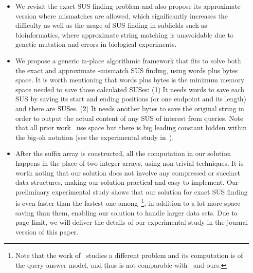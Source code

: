 \documentclass[11pt]{llncs}
\begin{document}
\begin{itemize}
\item 
We revisit the exact SUS finding problem and also
propose its approximate version where mismatches are allowed, which
significantly increases the difficulty as well as
the usage of SUS finding in subfields such as
bioinformatics, where approximate string matching is unavoidable due
to genetic mutation and errors in biological experiments.

\item 
We propose a generic in-place algorithmic framework that fits to solve
both the exact and approximate -mismatch SUS finding, using 
words plus  bytes space. It is worth mentioning that  words
plus  bytes is the minimum memory space needed to save those 
calculated SUSes: (1) It needs  words to save each SUS by saving
its start and ending positions (or one endpoint and its length) and
there are  SUSes. (2) It needs another  bytes to save the
original string  in order to output the actual content of any SUS
of interest from queries. Note that all prior
work~\cite{PWY-ICDE2013,TIBT2014,IKX-tcs2015,HPT-spire2014} use 
space but there is big leading constant hidden within the big-oh
notation (see the experimental study in~\cite{IKX-tcs2015}).

\item After the suffix array is constructed, all the computation in
  our solution happens in the place of two integer arrays, 
 using non-trivial techniques. It is worth noting that our solution
 does not 
  involve any compressed or succinct data structures, making our solution
  practical and easy to implement.  Our preliminary experimental study
  shows that our solution for exact SUS finding is even faster than
  the fastest one
  among~\cite{PWY-ICDE2013,TIBT2014,IKX-tcs2015}\footnote{Note
    that the work of~\cite{HPT-spire2014} studies a different problem and its
    computation is of the query-answer model, and thus is not
    comparable with~\cite{PWY-ICDE2013,TIBT2014,IKX-tcs2015} and
    ours.}, in addition to a lot more space saving than them, enabling
  our solution to handle larger data sets.  Due to page limit, we will
  deliver the details of our experimental study in the journal version
  of this paper.
\end{itemize}
\end{document}
